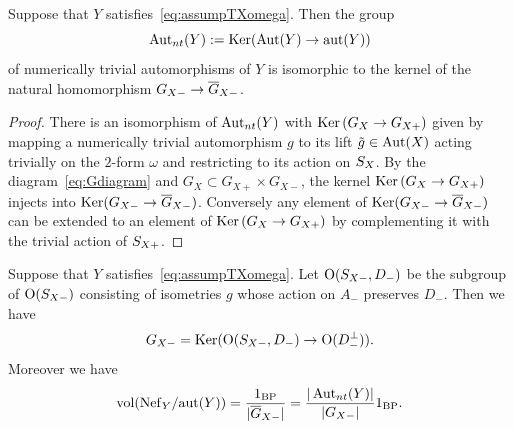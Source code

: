 \documentclass{amsart}
\numberwithin{procedure}{section}
\renewcommand{\ker}{\Ker}
\begin{document}
\begin{lemma}\label{lem:numerically-trivial}
Suppose that $Y$ satisfies~\eqref{eq:assumpTXomega}.
Then the group 
\[
\operatorname{\mathrm{Aut}}\nolimits_{nt}(Y):=\operatorname{\mathrm{Ker}}\nolimits (\operatorname{\mathrm{Aut}}\nolimits(Y) \to \mathord{\rm{aut}}(Y))
\]
 of numerically trivial automorphisms of $Y$ is isomorphic to the kernel of the natural homomorphism $G_{X-} \to \overline{G}_{X-}$.
\end{lemma}
%
\begin{proof}
There is an isomorphism of $\operatorname{\mathrm{Aut}}\nolimits_{nt}(Y)$ with $\ker \left(G_X \to G_{X+}\right)$ given by 
mapping a numerically trivial automorphism $g$ to its lift $\tilde{g} \in \operatorname{\mathrm{Aut}}\nolimits(X)$ acting trivially on the $2$-form $\omega$ 
and restricting to its action on $S_{X}$.
By the diagram~\eqref{eq:Gdiagram} and $G_X\subset G_{X+}\times G_{X-}$, 
the kernel  $\ker \left(G_X \to G_{X+}\right)$ injects into $\ker(G_{X-} \to \Gbar_{X-})$.
Conversely any element of  $\ker(G_{X-} \to \Gbar_{X-})$ can be extended to an element of $\ker \left(G_X \to G_{X+}\right)$
by complementing it with the trivial action of $S_{X+}$. 
\end{proof}
%
\begin{theorem}\label{thm:volumeformula}
Suppose that $Y$ satisfies~\eqref{eq:assumpTXomega}.
Let $\mathord{\mathrm{O}}(S_{X-}, D_-)$ be the subgroup of $\mathord{\mathrm{O}}(S_{X-})$
consisting of isometries $g$
whose action
on $A_-$ preserves $D_-$. 
Then we have  
%
\begin{equation}\label{eq:GXm}
G_{X-}=\operatorname{\mathrm{Ker}}\nolimits (\mathord{\mathrm{O}}(S_{X-}, D_-) \to \mathord{\mathrm{O}}(D_-\sp{\perp})).
\end{equation}
%
%
Moreover we have 
\begin{equation}\label{eq:nt}
\mathord{\rm{vol}}(\mathord{\rm Nef}_{Y}/\mathord{\rm{aut}}(Y))=\frac{1_{\mathord{\rm{BP}}}}{|\overline{G}_{X-}|}=\frac{|\operatorname{\mathrm{Aut}}\nolimits_{nt}(Y)|}{|G_{X-}|}1_{\mathord{\rm{BP}}}.
\end{equation}
\end{theorem}
%
%
\end{document}
